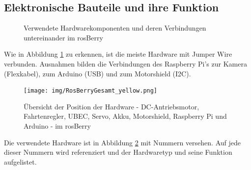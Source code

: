 \documentclass[conference]{IEEEtran}
\begin{document}
	\subsection{Elektronische Bauteile und ihre Funktion}\label{sec:Bauteile}
	\begin{figure} %
		\centering
		\def\svgwidth{9cm}
		
		\caption{Verwendete Hardwarekomponenten und deren Verbindungen untereinander im rosBerry}
		\label{Hardwarekomponenten}
	\end{figure}
	
	Wie in Abbildung \ref{Hardwarekomponenten} zu erkennen, ist die meiste Hardware mit Jumper Wire verbunden.
	Ausnahmen bilden die Verbindungen des Raspberry Pi's 
	zur Kamera (Flexkabel), zum Arduino (USB) und zum Motorshield (I2C).
	\\
	
	
	\begin{figure}[!ht]
		\centering
		\texttt{[image: img/RosBerryGesamt\_yellow.png]}
		\caption{Übersicht der Position der Hardware - DC-Antriebsmotor, Fahrtenregler, UBEC, Servo, Akku, Motorshield, Raspberry Pi und Arduino - im rosBerry}
		\label{rosBerryGesamt}
	\end{figure}
	
	Die verwendete Hardware ist in Abbildung \ref{rosBerryGesamt} mit Nummern versehen.
	Auf jede dieser Nummern wird referenziert und der Hardwaretyp und 
	seine Funktion aufgelistet.
	
\end{document}

